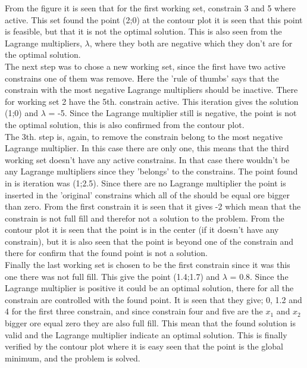 From the figure it is seen that for the first working set, constrain 3 and 5 where active. This set found the point (2;0) at the contour plot it is seen that this point is feasible, but that it is not the optimal solution. This is also seen from the Lagrange multipliers, $\lambda$, where they both are negative which they don't are for the optimal solution. \\The next step was to chose a new working set, since the first have two active constrains one of them was remove. Here the 'rule of thumbs' says that the constrain with the most negative Lagrange multipliers should be inactive. There for working set 2 have the 5th. constrain active. This iteration gives the solution (1;0) and $\lambda$ = -5. Since the Lagrange multiplier still is negative, the point is not the optimal solution, this is also confirmed from the contour plot. \\The 3th. step is, again, to remove the constrain belong to the most negative Lagrange multiplier. In this case there are only one, this means that the third working set doesn't have any active constrains. In that case there wouldn't  be any Lagrange multipliers since they 'belongs' to the constrains. The point found in is iteration was (1;2.5). Since there are no Lagrange multiplier the point is inserted in the 'original' constrains which all of the should be equal ore bigger than zero. From the first constrain it is seen that it gives -2 which mean that the constrain is not full fill and therefor not a solution to the problem. From the contour plot it is seen that the point is in the center (if it doesn't have any constrain), but it is also seen that the point is beyond one of the constrain and there for confirm that the found point is not a solution.\\Finally the last working set is chosen to be the first constrain since it was this one there was not full fill. This give the point (1.4;1.7) and $\lambda$ = 0.8. Since the Lagrange multiplier is positive it could be an optimal solution, there for all the constrain are controlled with the found point. It is seen that they give; 0, 1.2 and 4 for the first three constrain, and since constrain four and five are the $x_1$ and $x_2$ bigger ore equal zero they are also full fill. This mean that the found solution is valid and the Lagrange multiplier indicate an optimal solution. This is finally verified by the contour plot where it is easy seen that the point is the global minimum, and the problem is solved. \\
\\
